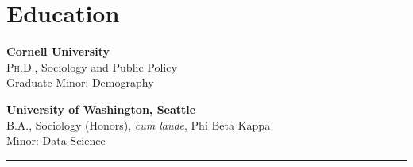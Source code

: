 \documentclass[11pt]{article} %
\begin{document}
\section*{Education}
 
  \textbf{Cornell University} \\
 \textsc{Ph.D.}, Sociology and Public Policy \\
	Graduate Minor: Demography
 
 \smallskip
{} \textbf{University of Washington, Seattle} \\
\textsc{B.A.}, Sociology (Honors), \emph{cum laude}, Phi Beta Kappa \\
Minor: Data Science \\

\noindent\rule{16cm}{0.4pt}

\end{document}

